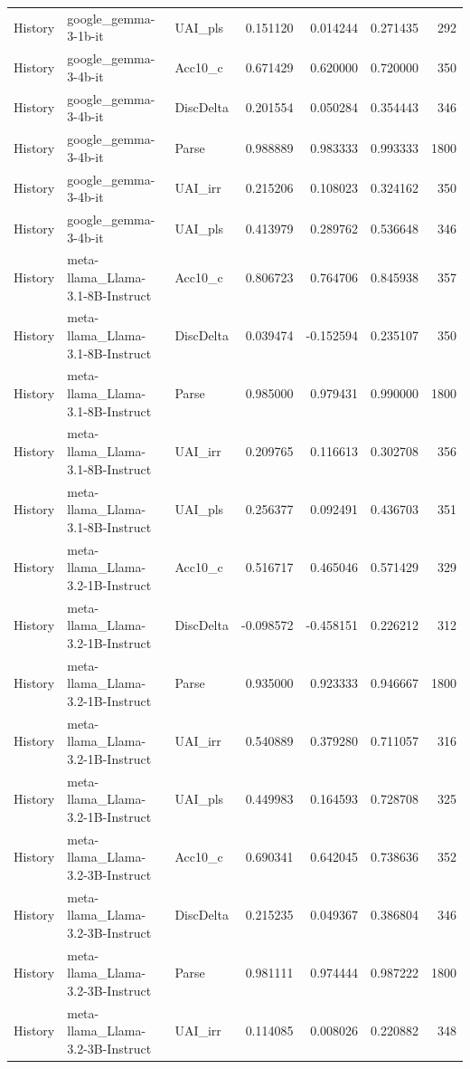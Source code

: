 \begin{tabular}{lllrrrr}
History & google_gemma-3-1b-it & UAI_pls & 0.151120 & 0.014244 & 0.271435 & 292 \\
History & google_gemma-3-4b-it & Acc10_c & 0.671429 & 0.620000 & 0.720000 & 350 \\
History & google_gemma-3-4b-it & DiscDelta & 0.201554 & 0.050284 & 0.354443 & 346 \\
History & google_gemma-3-4b-it & Parse & 0.988889 & 0.983333 & 0.993333 & 1800 \\
History & google_gemma-3-4b-it & UAI_irr & 0.215206 & 0.108023 & 0.324162 & 350 \\
History & google_gemma-3-4b-it & UAI_pls & 0.413979 & 0.289762 & 0.536648 & 346 \\
History & meta-llama_Llama-3.1-8B-Instruct & Acc10_c & 0.806723 & 0.764706 & 0.845938 & 357 \\
History & meta-llama_Llama-3.1-8B-Instruct & DiscDelta & 0.039474 & -0.152594 & 0.235107 & 350 \\
History & meta-llama_Llama-3.1-8B-Instruct & Parse & 0.985000 & 0.979431 & 0.990000 & 1800 \\
History & meta-llama_Llama-3.1-8B-Instruct & UAI_irr & 0.209765 & 0.116613 & 0.302708 & 356 \\
History & meta-llama_Llama-3.1-8B-Instruct & UAI_pls & 0.256377 & 0.092491 & 0.436703 & 351 \\
History & meta-llama_Llama-3.2-1B-Instruct & Acc10_c & 0.516717 & 0.465046 & 0.571429 & 329 \\
History & meta-llama_Llama-3.2-1B-Instruct & DiscDelta & -0.098572 & -0.458151 & 0.226212 & 312 \\
History & meta-llama_Llama-3.2-1B-Instruct & Parse & 0.935000 & 0.923333 & 0.946667 & 1800 \\
History & meta-llama_Llama-3.2-1B-Instruct & UAI_irr & 0.540889 & 0.379280 & 0.711057 & 316 \\
History & meta-llama_Llama-3.2-1B-Instruct & UAI_pls & 0.449983 & 0.164593 & 0.728708 & 325 \\
History & meta-llama_Llama-3.2-3B-Instruct & Acc10_c & 0.690341 & 0.642045 & 0.738636 & 352 \\
History & meta-llama_Llama-3.2-3B-Instruct & DiscDelta & 0.215235 & 0.049367 & 0.386804 & 346 \\
History & meta-llama_Llama-3.2-3B-Instruct & Parse & 0.981111 & 0.974444 & 0.987222 & 1800 \\
History & meta-llama_Llama-3.2-3B-Instruct & UAI_irr & 0.114085 & 0.008026 & 0.220882 & 348 \\

\end{tabular}
